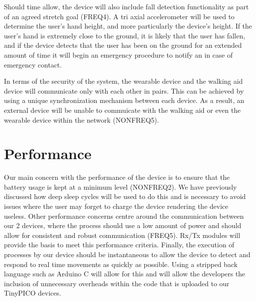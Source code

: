         Should time allow, the device will also include fall detection functionality as part of an agreed stretch goal
        (FREQ4). A tri axial accelerometer will be used to determine the user's hand height, and more particularly the
        device's height. If the user's hand is extremely close to the ground, it is likely that the user has fallen, and
        if the device detects that the user has been on the ground for an extended amount of time it will begin an
        emergency procedure to notify an in case of emergency contact.

        In terms of the security of the system, the wearable device and the walking aid device will communicate only
        with each other in pairs. This can be achieved by using a unique synchronization mechanism between each device.
        As a result, an external device will be unable to commuicate with the walking aid or even the wearable device
        within the network (NONFREQ5).

    \section{Performance}

        Our main concern with the performance of the device is to ensure that the battery usage is kept at a minimum
        level (NONFREQ2). We have previously discussed how deep sleep cycles will be used to do this and is necessary to
        avoid issues where the user may forget to charge the device rendering the device useless. Other performance
        concerns centre around the communication between our 2 devices, where the process should use a low amount of
        power and should allow for consistent and robust communication (FREQ5). Rx/Tx modules will provide the basis to
        meet this performance criteria. Finally, the execution of processes by our device should be instantaneous to
        allow the device to detect and respond to real time movements as quickly as possible. Using a stripped back
        language such as Arduino C will allow for this and will allow the developers the inclusion of unnecessary
        overheads within the code that is uploaded to our TinyPICO devices.
